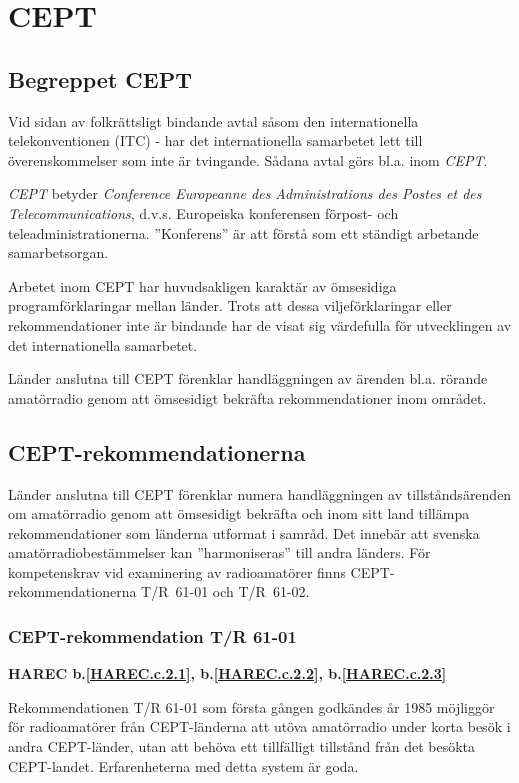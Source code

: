 \section{CEPT}

\subsection{Begreppet CEPT}

Vid sidan av folkrättsligt bindande avtal såsom den internationella
telekonventionen (ITC) - har det internationella samarbetet lett till
överenskommelser som inte är tvingande. Sådana avtal görs bl.a. inom
\emph{CEPT}.

\emph{CEPT} betyder \emph{Conference Europeanne des Administrations
  des Postes et des Telecommunications}, d.v.s. Europeiska konferensen
förpost- och teleadministrationerna. ''Konferens'' är att förstå som
ett ständigt arbetande samarbetsorgan.

Arbetet inom CEPT har huvudsakligen karaktär av ömsesidiga
programförklaringar mellan länder. Trots att dessa viljeförklaringar
eller rekommendationer inte är bindande har de visat sig värdefulla
för utvecklingen av det internationella samarbetet.

Länder anslutna till CEPT förenklar handläggningen av ärenden
bl.a. rörande amatörradio genom att ömsesidigt bekräfta
rekommendationer inom området.

\subsection{CEPT-rekommendationerna}

Länder anslutna till CEPT förenklar numera handläggningen av
tillståndsärenden om amatörradio genom att ömsesidigt bekräfta och
inom sitt land tillämpa rekommendationer som länderna utformat i
samråd. Det innebär att svenska amatörradiobestämmelser kan
''harmoniseras'' till andra länders.  För kompetenskrav vid
examinering av radioamatörer finns CEPT-rekommendationerna T/R~61-01
och T/R~61-02.

\subsubsection{CEPT-rekommendation T/R 61-01}
\textbf{
HAREC b.\ref{HAREC.c.2.1}\label{myHAREC.c.2.1},
 b.\ref{HAREC.c.2.2}\label{myHAREC.c.2.2},
 b.\ref{HAREC.c.2.3}\label{myHAREC.c.2.3}
}

Rekommendationen T/R 61-01 som första gången godkändes år 1985 möjliggör för
radioamatörer från CEPT-länderna att utöva amatörradio under korta besök i
andra CEPT-länder, utan att behöva ett tillfälligt tillstånd från det besökta
CEPT-landet. Erfarenheterna med detta system är goda.

